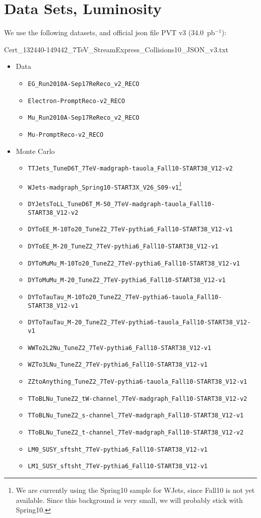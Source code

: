 \section{Data Sets, Luminosity}
\label{sec:datasets}

We use the following datasets, and official json file PVT v3 (34.0~pb$^{-1}$):

Cert\_132440-149442\_7TeV\_StreamExpress\_Collisions10\_JSON\_v3.txt


\begin{itemize}
\item Data 
\begin{itemize}
\item \verb=EG_Run2010A-Sep17ReReco_v2_RECO=
\item \verb=Electron-PromptReco-v2_RECO=
\item \verb=Mu_Run2010A-Sep17ReReco_v2_RECO=
\item \verb=Mu-PromptReco-v2_RECO=
\end{itemize}

\item Monte Carlo
\begin{itemize} 
\item \verb=TTJets_TuneD6T_7TeV-madgraph-tauola_Fall10-START38_V12-v2=
\item \verb=WJets-madgraph_Spring10-START3X_V26_S09-v1=\footnote{We are currently using the Spring10 sample for WJets, 
since Fall10 is not yet available. Since this background is very small, we will probably stick with Spring10.}
\item \verb=DYJetsToLL_TuneD6T_M-50_7TeV-madgraph-tauola_Fall10-START38_V12-v2=
\item \verb=DYToEE_M-10To20_TuneZ2_7TeV-pythia6_Fall10-START38_V12-v1=
\item \verb=DYToEE_M-20_TuneZ2_7TeV-pythia6_Fall10-START38_V12-v1=
\item \verb=DYToMuMu_M-10To20_TuneZ2_7TeV-pythia6_Fall10-START38_V12-v1=
\item \verb=DYToMuMu_M-20_TuneZ2_7TeV-pythia6_Fall10-START38_V12-v1=
\item \verb=DYToTauTau_M-10To20_TuneZ2_7TeV-pythia6-tauola_Fall10-START38_V12-v1=
\item \verb=DYToTauTau_M-20_TuneZ2_7TeV-pythia6-tauola_Fall10-START38_V12-v1=
\item \verb=WWTo2L2Nu_TuneZ2_7TeV-pythia6_Fall10-START38_V12-v1=
\item \verb=WZTo3LNu_TuneZ2_7TeV-pythia6_Fall10-START38_V12-v1=
\item \verb=ZZtoAnything_TuneZ2_7TeV-pythia6-tauola_Fall10-START38_V12-v1=
\item \verb=TToBLNu_TuneZ2_tW-channel_7TeV-madgraph_Fall10-START38_V12-v2=
\item \verb=TToBLNu_TuneZ2_s-channel_7TeV-madgraph_Fall10-START38_V12-v1=
\item \verb=TToBLNu_TuneZ2_t-channel_7TeV-madgraph_Fall10-START38_V12-v2=
\item \verb=LM0_SUSY_sftsht_7TeV-pythia6_Fall10-START38_V12-v1=
\item \verb=LM1_SUSY_sftsht_7TeV-pythia6_Fall10-START38_V12-v1=
\end{itemize}
\end{itemize}



